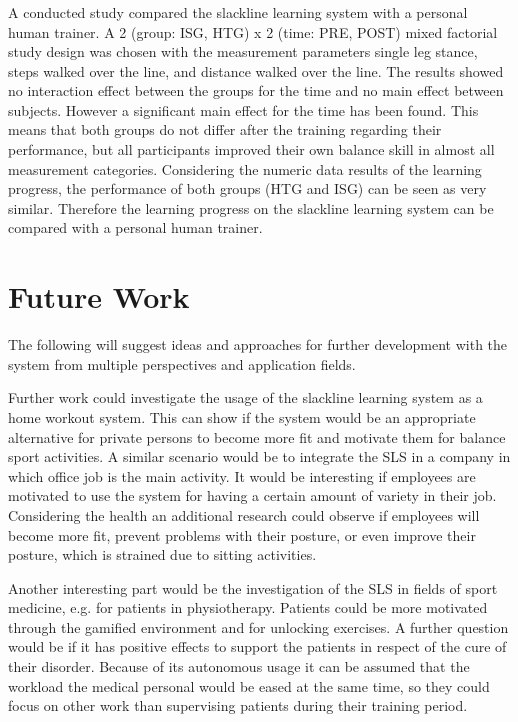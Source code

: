 \subsubsection{}
A conducted study compared the slackline learning system with a personal human trainer.
A 2 (group: ISG, HTG) x 2 (time: PRE, POST) mixed factorial study design was chosen with the measurement parameters single leg stance, steps walked over the line, and distance walked over the line.
The results showed no interaction effect between the groups for the time and no main effect between subjects.
However a significant main effect for the time has been found.
This means that both groups do not differ after the training regarding their performance, but all participants improved their own balance skill in almost all measurement categories.
Considering the numeric data results of the learning progress, the performance of both groups (HTG and ISG) can be seen as very similar.
Therefore the learning progress on the slackline learning system can be compared with a personal human trainer.

\section{Future Work}
The following will suggest ideas and approaches for further development with the system from multiple perspectives and application fields.

Further work could investigate the usage of the slackline learning system as a home workout system.
This can show if the system would be an appropriate alternative for private persons to become more fit and motivate them for balance sport activities.
A similar scenario would be to integrate the SLS in a company in which office job is the main activity.
It would be interesting if employees are motivated to use the system for having a certain amount of variety in their job.
Considering the health an additional research could observe if employees will become more fit, prevent problems with their posture, or even improve their posture, which is strained due to sitting activities.

Another interesting part would be the investigation of the SLS in fields of sport medicine, e.g. for patients in physiotherapy.
Patients could be more motivated through the gamified environment and for unlocking exercises.
A further question would be if it has positive effects to support the patients in respect of the cure of their disorder.
Because of its autonomous usage it can be assumed that the workload the medical personal would be eased at the same time, so they could focus on other work than supervising patients during their training period.

